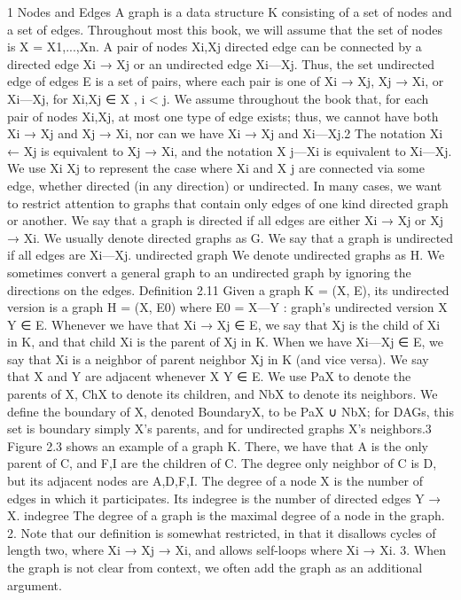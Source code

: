1 Nodes and Edges
A graph is a data structure K consisting of a set of nodes and a set of edges. Throughout most this book, we will assume that the set of nodes is X = {X1,...,Xn}. A pair of nodes Xi,Xj directed edge can be connected by a directed edge Xi → Xj or an undirected edge Xi—Xj. Thus, the set undirected edge of edges E is a set of pairs, where each pair is one of Xi → Xj, Xj → Xi, or Xi—Xj, for Xi,Xj ∈ X , i < j. We assume throughout the book that, for each pair of nodes Xi,Xj, at most one type of edge exists; thus, we cannot have both Xi → Xj and Xj → Xi, nor can we have Xi → Xj and Xi—Xj.2 The notation Xi ← Xj is equivalent to Xj → Xi, and the notation X j—Xi is equivalent to Xi—Xj. We use Xi Xj to represent the case where Xi and X j are connected via some edge, whether directed (in any direction) or undirected. In many cases, we want to restrict attention to graphs that contain only edges of one kind directed graph or another. We say that a graph is directed if all edges are either Xi → Xj or Xj → Xi. We usually denote directed graphs as G. We say that a graph is undirected if all edges are Xi—Xj. undirected graph We denote undirected graphs as H. We sometimes convert a general graph to an undirected graph by ignoring the directions on the edges. Definition 2.11 Given a graph K = (X, E), its undirected version is a graph H = (X, E0) where E0 = {X—Y : graph’s undirected version X Y ∈ E}. Whenever we have that Xi → Xj ∈ E, we say that Xj is the child of Xi in K, and that child Xi is the parent of Xj in K. When we have Xi—Xj ∈ E, we say that Xi is a neighbor of parent neighbor Xj in K (and vice versa). We say that X and Y are adjacent whenever X Y ∈ E. We use PaX to denote the parents of X, ChX to denote its children, and NbX to denote its neighbors. We define the boundary of X, denoted BoundaryX, to be PaX ∪ NbX; for DAGs, this set is boundary simply X’s parents, and for undirected graphs X’s neighbors.3 Figure 2.3 shows an example of a graph K. There, we have that A is the only parent of C, and F,I are the children of C. The degree only neighbor of C is D, but its adjacent nodes are A,D,F,I. The degree of a node X is the number of edges in which it participates. Its indegree is the number of directed edges Y → X. indegree The degree of a graph is the maximal degree of a node in the graph. 2. Note that our definition is somewhat restricted, in that it disallows cycles of length two, where Xi → Xj → Xi, and allows self-loops where Xi → Xi. 3. When the graph is not clear from context, we often add the graph as an additional argument.


